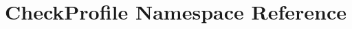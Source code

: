 \hypertarget{namespaceCheckProfile}{\section{Check\-Profile Namespace Reference}
\label{namespaceCheckProfile}
}
